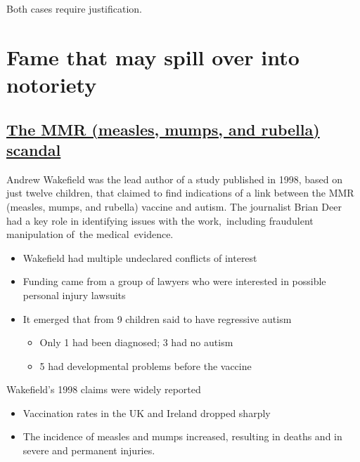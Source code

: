\documentclass[
  10pt,
  b5paper]{book}
\providecommand{\tightlist}{%
  \setlength{\itemsep}{0pt}\setlength{\parskip}{0pt}}
\begin{document}
Both cases require justification.

\hypertarget{fame-that-may-spill-over-into-notoriety}{%
\chapter{Fame that may spill over into notoriety}\label{fame-that-may-spill-over-into-notoriety}}

\hypertarget{the-mmr-measles-mumps-and-rubella-scandal}{%
\section{\texorpdfstring{\href{https://en.wikipedia.org/wiki/MMR_vaccine_controversy}{The MMR (measles, mumps, and rubella) scandal}}{The MMR (measles, mumps, and rubella) scandal}}\label{the-mmr-measles-mumps-and-rubella-scandal}}

Andrew Wakefield was the lead author of a study published in 1998,
based on just twelve children, that claimed to find indications
of a link between the MMR (measles, mumps, and rubella) vaccine
and autism. The journalist Brian Deer had a key role in
identifying issues with the work,~including fraudulent
manipulation of~the medical~evidence.

\begin{itemize}
\tightlist
\item
  Wakefield had multiple undeclared conflicts of interest
\item
  Funding came from a group of lawyers who were interested
  in possible personal injury lawsuits
\item
  It emerged that from 9 children said to have regressive autism

  \begin{itemize}
  \tightlist
  \item
    Only 1 had been diagnosed; 3 had no autism\\
  \item
    5 had developmental problems before the vaccine
  \end{itemize}
\end{itemize}

Wakefield's 1998 claims were widely reported

\begin{itemize}
\tightlist
\item
  Vaccination rates in the UK and Ireland dropped sharply
\item
  The incidence of measles and mumps increased, resulting
  in deaths and in severe and permanent injuries.
\end{itemize}
\end{document}
